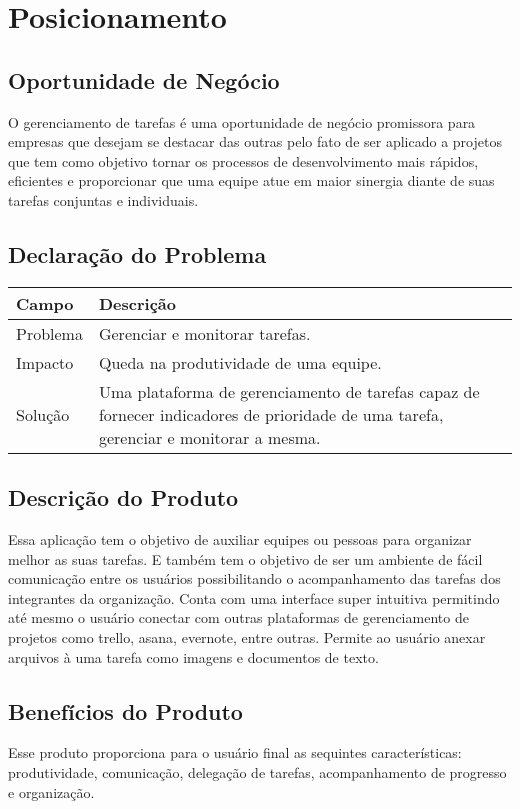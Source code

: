 \chapter{Posicionamento}

\section{Oportunidade de Negócio}


O gerenciamento de tarefas é uma oportunidade de negócio promissora para empresas que desejam se destacar das outras pelo fato de ser aplicado a projetos que tem como objetivo tornar os processos de desenvolvimento mais rápidos, eficientes e proporcionar que uma equipe atue em maior sinergia diante de suas tarefas conjuntas e individuais. 



\section{Declaração do Problema}
\begin{tabularx}{\textwidth}{| l | X |}
    \hline
    Campo             & Descrição                                                                                                                                                                           \\ \hline
    Problema          & Gerenciar e monitorar tarefas.\\ \hline
    Impacto           & Queda na produtividade de uma equipe. \\ \hline
    Solução           & Uma plataforma de gerenciamento de tarefas capaz de fornecer indicadores de prioridade de uma tarefa, gerenciar e monitorar a mesma.\\ \hline
\end{tabularx}


\section{Descrição do Produto}
Essa aplicação tem o objetivo de auxiliar equipes ou pessoas para organizar melhor as suas tarefas. E também tem o objetivo de ser um ambiente de fácil comunicação entre os usuários possibilitando o acompanhamento das tarefas dos integrantes da organização.
Conta com uma interface super intuitiva  permitindo até mesmo o usuário conectar com outras plataformas de gerenciamento de projetos como trello, asana, evernote, entre outras. 
Permite ao usuário anexar arquivos à uma tarefa como imagens e documentos de texto.


\section{Benefícios do Produto}
Esse produto proporciona para o usuário final as sequintes características: produtividade, comunicação, delegação de tarefas, acompanhamento de progresso e organização. 